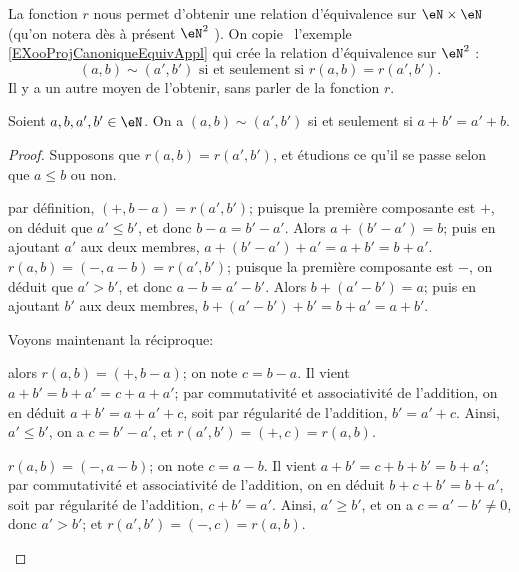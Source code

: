 \begin{normaltext}	\label{NORMooEntiersRelatifsEquivalence}
	La fonction \( r \) nous permet d'obtenir une relation d'équivalence sur \( \eN \times \eN \) (qu'on notera dès à présent \( \eN^2 \) ). On \og copie \fg\ l'exemple \ref{EXooProjCanoniqueEquivAppl} %
 	qui crée la relation d'équivalence sur \( \eN^2 \) :
  	\begin{equation}
   		(a,b)\sim(a',b') \text{ si et seulement si } r(a,b) = r(a',b').
   	\end{equation}
	Il y a un autre moyen de l'obtenir, sans parler de la fonction \( r \).
\end{normaltext}

\begin{proposition}	\label{PROPooEquivalenceSoustraction}
  	Soient \( a, b, a', b' \in \eN\). On a \( (a,b)\sim(a',b')\) si et seulement si \( a+b' = a'+b \).
\end{proposition}

\begin{proof}
	Supposons que \( r(a,b) = r(a',b') \), et étudions ce qu'il se passe selon que \( a \leq b \) ou non.
    \begin{subproof}
  		\spitem[Si \( a \leq b \):]
		par définition,  \( (+, b-a) = r(a', b')  \); puisque la première composante est \( + \), on déduit que \( a' \leq b' \), et donc \( b-a = b' - a' \). Alors \( a + (b' - a') = b \); puis en ajoutant \( a' \) aux deux membres, \( a + (b' - a') + a' = a+b' = b + a' \).
  		\spitem[Sinon:]
		\( r(a,b) = (-, a-b)= r(a', b') \); puisque la première composante est \( - \), on déduit que \( a' > b' \), et donc \( a - b = a' - b' \). Alors \( b + (a' - b') = a \); puis en ajoutant \( b' \) aux deux membres, \( b + (a' - b') + b' = b + a' = a+b' \).
  	\end{subproof}

    Voyons maintenant la réciproque:
	\begin{subproof}
  		\spitem[Si \( a \leq b \):]
		alors \( r(a,b) = (+, b-a) \); on note \( c = b - a \). Il vient \( a + b' = b + a' = c + a + a' \); par commutativité et associativité de l'addition, on en déduit \( a + b' = a + a' + c \), soit par régularité de l'addition, \( b' =  a' + c \).  Ainsi, \( a' \leq b' \), on a \( c = b' - a' \), et \( r(a', b') = (+, c) = r(a,b) \).

  		\spitem[Sinon:]
		\( r(a,b) = (-, a-b) \); on note \( c = a - b \). Il vient \( a + b' =  c + b + b' = b + a'\); par commutativité et associativité de l'addition, on en déduit \( b + c + b' = b + a' \), soit par régularité de l'addition, \( c + b' =  a' \).  Ainsi, \( a' \geq b' \), et on a \( c = a' - b' \neq 0 \), donc \( a' > b' \); et \( r(a', b') = (-, c) = r(a,b) \).
  	\end{subproof}
\end{proof}

